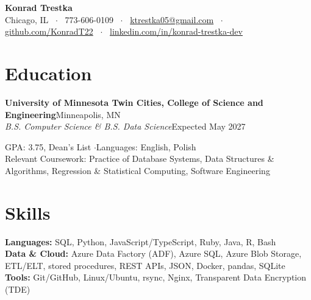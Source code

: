 \documentclass[letterpaper,10.5pt]{article}
\newcommand{\entry}[4]{\textbf{#1}\hfill{\small #2}\\\textit{\small #3}\hfill{\small #4}\par\vspace{1pt}}
\begin{document}
{\centering
{\LARGE\bfseries Konrad Trestka}\\[3pt]
{\small Chicago, IL ~$\cdot$~ 773-606-0109 ~$\cdot$~ \href{mailto:ktrestka05@gmail.com}{ktrestka05@gmail.com} ~$\cdot$~ \href{https://github.com/KonradT22}{github.com/KonradT22} ~$\cdot$~ \href{https://www.linkedin.com/in/konrad-trestka-dev}{linkedin.com/in/konrad-trestka-dev}}\par}
\vspace{2pt}

\section{Education}
\entry{University of Minnesota Twin Cities, College of Science and Engineering}{Minneapolis, MN}{B.S. Computer Science \& B.S. Data Science}{Expected May 2027}
{\small GPA: 3.75, Dean's List \quad$\cdot$\quad Languages: English, Polish \\
Relevant Coursework: Practice of Database Systems, Data Structures \& Algorithms, Regression \& Statistical Computing, Software Engineering}

\section{Skills}
{\small \textbf{Languages:} SQL, Python, JavaScript/TypeScript, Ruby, Java, R, Bash \\
\textbf{Data \& Cloud:} Azure Data Factory (ADF), Azure SQL, Azure Blob Storage, ETL/ELT, stored procedures, REST APIs, JSON, Docker, pandas, SQLite \\
\textbf{Tools:} Git/GitHub, Linux/Ubuntu, rsync, Nginx, Transparent Data Encryption (TDE)}
\end{document}
